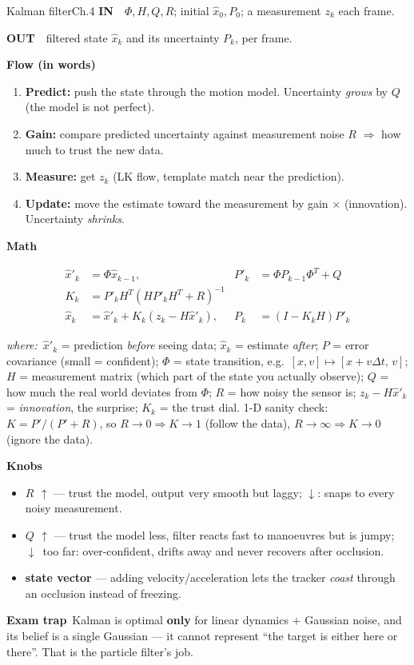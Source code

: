 \documentclass[9pt,a4paper]{extarticle}
\newcommand{\IN}{\textbf{\color{cIn}IN}\ }
\newcommand{\OUT}{\par\textbf{\color{cOut}OUT}\ }
\newcommand{\FLOW}{\par\smallskip\textbf{Flow (in words)}\par\nopagebreak}
\newcommand{\MATH}{\par\smallskip\textbf{Math}\par\nopagebreak}
\newcommand{\KNOBS}{\par\smallskip\textbf{Knobs}\par\nopagebreak}
\newcommand{\TRAP}{\par\smallskip\textbf{\color{cTrap}Exam trap}\ }
\newcommand{\WHERE}{\par\textit{where:}\ }
\newcommand{\up}{$\uparrow$}
\newcommand{\dn}{$\downarrow$}
\newcommand{\kn}[2]{\item \textbf{#1} --- #2}
\begin{document}
\begin{card}{Kalman filter}{Ch.4}
\IN\ $\Phi,H,Q,R$; initial $\hat x_0,P_0$; a measurement $z_k$ each frame.
\OUT\ filtered state $\hat x_k$ and its uncertainty $P_k$, per frame.

\FLOW
\begin{enumerate}
  \item \textbf{Predict:} push the state through the motion model. Uncertainty \emph{grows} by $Q$ (the model is not perfect).
  \item \textbf{Gain:} compare predicted uncertainty against measurement noise $R$ $\Rightarrow$ how much to trust the new data.
  \item \textbf{Measure:} get $z_k$ (LK flow, template match near the prediction).
  \item \textbf{Update:} move the estimate toward the measurement by gain $\times$ (innovation). Uncertainty \emph{shrinks}.
\end{enumerate}

\MATH
\begin{align*}
\hat x'_k&=\Phi\hat x_{k-1}, & P'_k&=\Phi P_{k-1}\Phi^T+Q\\
K_k&=P'_kH^T(HP'_kH^T+R)^{-1} & &\\
\hat x_k&=\hat x'_k+K_k(z_k-H\hat x'_k), & P_k&=(I-K_kH)P'_k
\end{align*}
\WHERE $\hat x'_k$ = prediction \emph{before} seeing data; $\hat x_k$ = estimate \emph{after}; $P$ = error covariance (small = confident); $\Phi$ = state transition, e.g.\ $[x,v]\mapsto[x+v\Delta t,\,v]$; $H$ = measurement matrix (which part of the state you actually observe); $Q$ = how much the real world deviates from $\Phi$; $R$ = how noisy the sensor is; $z_k-H\hat x'_k$ = \emph{innovation}, the surprise; $K_k$ = the trust dial. 1-D sanity check: $K=P'/(P'+R)$, so $R\to0\Rightarrow K\to1$ (follow the data), $R\to\infty\Rightarrow K\to0$ (ignore the data).

\KNOBS
\begin{itemize}
  \kn{$R$ \up}{trust the model, output very smooth but laggy; \dn: snaps to every noisy measurement.}
  \kn{$Q$ \up}{trust the model less, filter reacts fast to manoeuvres but is jumpy; \dn\ too far: over-confident, drifts away and never recovers after occlusion.}
  \kn{state vector}{adding velocity/acceleration lets the tracker \emph{coast} through an occlusion instead of freezing.}
\end{itemize}
\TRAP Kalman is optimal \textbf{only} for linear dynamics $+$ Gaussian noise, and its belief is a single Gaussian --- it cannot represent ``the target is either here or there''. That is the particle filter's job.
\end{card}
\end{document}

